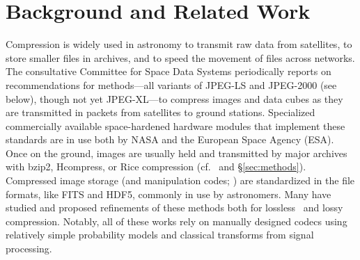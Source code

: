 \section{Background and Related Work}
\label{sec:relatex}
Compression is widely used in astronomy to transmit raw data from satellites, to store smaller files in archives, and to speed the movement of files across networks.  The consultative Committee for Space Data Systems \citep{ccsds2024} periodically reports on recommendations for methods---all variants of JPEG-LS and JPEG-2000 (see below), though not yet JPEG-XL---to compress images and data cubes as they are transmitted in packets from satellites to ground stations. Specialized commercially available space-hardened hardware modules that implement these standards are in use both by NASA and the European Space Agency (ESA). Once on the ground, images are usually held and transmitted by major archives with bzip2, Hcompress, or Rice compression (cf.~\citealt{pence2009lossless} and \S \ref{sec:methods}). Compressed image storage (and manipulation codes; \citealt{2010ascl.soft10002S}) are standardized in the file formats, like FITS \citep{2010A&A...524A..42P} and HDF5, commonly in use by astronomers. Many have studied and proposed refinements of these methods both for lossless~\citep{villafranca2013prediction, pata2015astronomical, thomas2015learning, maireles2023efficient,mandeel2021comparative} and lossy~\citep{maireles2022analysis} compression. Notably, all of these works rely on manually designed codecs using 
relatively simple probability models and classical transforms from signal processing.



